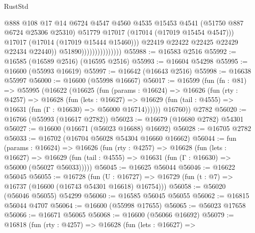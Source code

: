\begin{lexlean}{RustStd}
\begin{coremodule}
{\begin{coremodule}
{{{{{{{{{{{{{{{{{{{{{{{{{{{{{{{{{{{{{{{{{{{{{{{{{{{{{{{                                          @888
                                          @108
                                          @17
                                          @14
                                          @6724
                                          @4547
                                          @4560
                                          @4535
                                          @15453
                                          @4541
                                          (@51750 @887 @6724 @25306 @25310)
                                          @51779
                                          @17017
                                          (@17014 (@17019 @15454 @4547)))
                                        @17017
                                        (@17014 (@17019 @15444 @15460)))
                                      @22419
                                      @22422
                                      @22425
                                      @22429
                                      @22434
                                      @22440))
                                  @51890)))))))))))))))
@55988 := @16583 @2516
@55992 := @16585 (@16589 @2516) (@16595 @2516)
@55993 := @16604 @54298
@55995 := @16600 (@55993 @16619)
@55997 := @16642 (@16643 @2516)
@55998 := @16638 @55997
@56000 := @16600 (@55998 @16667)
@56017 := @16599
    (fun (fn : @81) =>
    @55995
      (@16622
        (@16625
          (fun (params : @16624) =>
          @16626
            (fun (rty : @4257) =>
            @16628
              (fun (lets : @16627) =>
              @16629 (fun (tail : @4555) => @16631 (fun (Γ : @16630) => @56000 @16714))))))
        @16760))
    @2782
@56020 := @16766 (@55993 (@16617 @2782))
@56023 := @16679 (@16680 @2782) @54301
@56027 := @16600 (@16671 (@56023 @16688) @16692)
@56028 := @16705 @2782
@56033 := @16702 (@16704 @56028 @54304 @16660 @16662)
@56044 := fun (params : @16624) =>
  @16626
    (fun (rty : @4257) =>
    @16628
      (fun (lets : @16627) =>
      @16629 (fun (tail : @4555) => @16631 (fun (Γ : @16630) => @56000 (@56027 @56033)))))
@56045 := @16625 @56044
@56046 := @16622 @56045
@56055 := @16728
    (fun (U : @16727) => @16729 (fun (t : @7) => @16737 (@16600 (@16743 @54301 @16618) @16754)))
@56058 := @56020 (@56046 @56055) @54299
@56060 := @16585 @56045 @56055
@56062 := @16815 @56044 @4707
@56064 := @16600 (@55998 @17655)
@56065 := @56023 @17658
@56066 := @16671 @56065
@56068 := @16600 (@56066 @16692)
@56079 := @16818
    (fun (rty : @4257) =>
    @16628
      (fun (lets : @16627) =>
}}}}}}}}}}}}}}}}}}}}}}}}}}}}}}}}}}}}}}}}}}}}}}}}}}}}}}}
\end{coremodule}}
\end{coremodule}
\end{lexlean}
